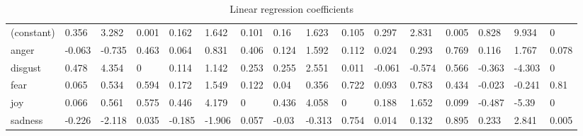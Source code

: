 \documentclass[graybox]{svmult}
\begin{document}
\begin{table}[!ht]
{\begin{tabular}{@{}llll|lll|lll|lll|lll@{}}
(constant) & 0.356                 & 3.282                 & 0.001                   & 0.162                 & 1.642                 & 0.101                   & 0.16                  & 1.623                 & 0.105                   & 0.297      & 2.831     & 0.005    & 0.828          & 9.934   & 0      \\
anger      & -0.063                & -0.735                & 0.463                   & 0.064                 & 0.831                 & 0.406                   & 0.124                 & 1.592                 & 0.112                   & 0.024      & 0.293     & 0.769    & 0.116          & 1.767    & 0.078     \\
disgust    & 0.478                 & 4.354                 & 0                       & 0.114                 & 1.142                 & 0.253                   & 0.255                 & 2.551                 & 0.011                   & -0.061     & -0.574    & 0.566    & -0.363         & -4.303    & 0    \\
fear       & 0.065                 & 0.534                 & 0.594                   & 0.172                 & 1.549                 & 0.122                   & 0.04                  & 0.356                 & 0.722                   & 0.093      & 0.783     & 0.434    & -0.023         & -0.241    & 0.81    \\
joy        & 0.066                 & 0.561                 & 0.575                   & 0.446                 & 4.179                 & 0                       & 0.436                 & 4.058                 & 0                       & 0.188      & 1.652     & 0.099    & -0.487         & -5.39   & 0      \\
sadness    & -0.226                & -2.118                & 0.035                   & -0.185                & -1.906                & 0.057                   & -0.03                 & -0.313                & 0.754                   & 0.014      & 0.132     & 0.895    & 0.233          & 2.841     & 0.005    \\

\bottomrule

\end{tabular}%
}
\caption{Linear regression coefficients}
\label{tbl:linreg}
\end{table}
\end{document}
